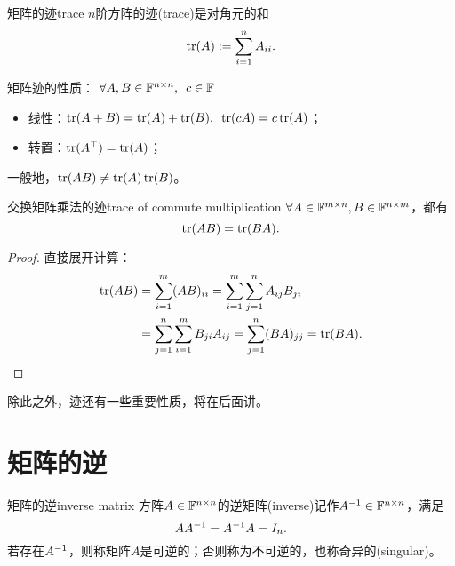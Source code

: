 \begin{definition}{矩阵的迹}{trace}
	$n$阶方阵的迹(trace)是对角元的和
	\begin{equation}
		\operatorname{tr}(A):=\sum_{i=1}^nA_{ii}.
	\end{equation}
\end{definition}
\begin{corollary}
	矩阵迹的性质：%
	$\forall A,B\in\mathbb F^{n\times n},\enspace c\in\mathbb F$
    \begin{itemize}
    	\item 线性：$\operatorname{tr}(A+B)=\operatorname{tr}(A)+\operatorname{tr}(B),\enspace \operatorname{tr}(cA)=c\operatorname{tr}(A)$；
    	\item 转置：$\operatorname{tr}(A^\top)=\operatorname{tr}(A)$；
    \end{itemize}
\end{corollary}
\begin{remark}
	一般地，$\operatorname{tr}(AB)\neq\operatorname{tr}(A)\operatorname{tr}(B)$。
\end{remark}
\begin{theorem}{交换矩阵乘法的迹}{trace of commute multiplication}
	$\forall A\in\mathbb F^{m\times n},B\in\mathbb F^{n\times m}$，都有
	\begin{equation}
		\operatorname{tr}(AB)=\operatorname{tr}(BA).
	\end{equation}
\end{theorem}
\begin{proof}
	直接展开计算：
	\begin{align*}
		\operatorname{tr}(AB)&=\sum_{i=1}^m(AB)_{ii}=\sum_{i=1}^m\sum_{j=1}^nA_{ij}B_{ji}\\
		&=\sum_{j=1}^n\sum_{i=1}^mB_{ji}A_{ij}=\sum_{j=1}^n(BA)_{jj}=\operatorname{tr}(BA).
		\qedhere
	\end{align*}
\end{proof}

\begin{remark}
	除此之外，迹还有一些重要性质，将在后面讲。
\end{remark}

\section{矩阵的逆}

\begin{definition}{矩阵的逆}{inverse matrix}
	方阵$A\in\mathbb F^{n\times n}$的逆矩阵(inverse)记作$A^{-1}\in\mathbb F^{n\times n}$，满足
	\[
		AA^{-1}=A^{-1} A=I_n.
	\]
	若存在$A^{-1}$，则称矩阵$A$是可逆的；否则称为不可逆的，也称奇异的(singular)。
\end{definition}

